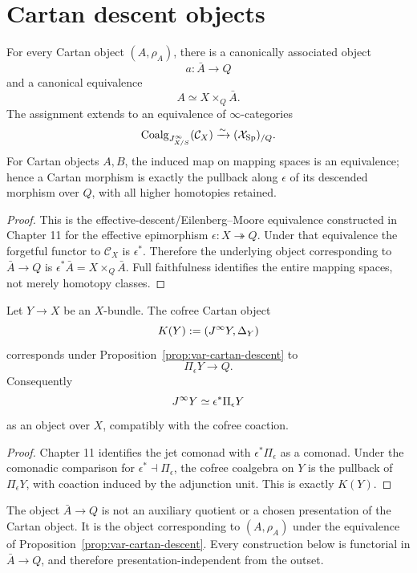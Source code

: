 \section{Cartan descent objects}
\label{sec:var-cartan-descent}

\begin{proposition}
\label{prop:var-cartan-descent}
For every Cartan object \((A,\rho_A)\), there is a canonically associated object
\[
    a:\bar A\longrightarrow Q
\]
and a canonical equivalence
\[
    A\simeq X\times_Q\bar A.
\]
The assignment extends to an equivalence of \(\infty\)-categories
\[
    \operatorname{Coalg}_{J^{\infty}_{X/S}}(\mathcal C_X)
    \xrightarrow{\sim}
    (\mathcal{X}_{\mathrm{Sp}})_{/Q}.
\]
For Cartan objects \(A,B\), the induced map on mapping spaces is an equivalence; hence a Cartan morphism is exactly the pullback along \(\epsilon\) of its descended morphism over \(Q\), with all higher homotopies retained.
\end{proposition}

\begin{proof}
This is the effective-descent/Eilenberg--Moore equivalence constructed in Chapter 11 for the effective epimorphism \(\epsilon:X\twoheadrightarrow Q\). Under that equivalence the forgetful functor to \(\mathcal C_X\) is \(\epsilon^*\). Therefore the underlying object corresponding to \(\bar A\to Q\) is \(\epsilon^*\bar A=X\times_Q\bar A\). Full faithfulness identifies the entire mapping spaces, not merely homotopy classes.
\end{proof}

\begin{proposition}
\label{prop:var-cofree-descent}
Let \(Y\to X\) be an \(X\)-bundle. The cofree Cartan object
\[
    K(Y):=(J^{\infty} Y,\Delta_Y)
\]
corresponds under Proposition~\ref{prop:var-cartan-descent} to
\[
    \Pi_\epsilon Y\longrightarrow Q.
\]
Consequently
\[
    J^{\infty} Y\simeq\epsilon^*\Pi_\epsilon Y
\]
as an object over \(X\), compatibly with the cofree coaction.
\end{proposition}

\begin{proof}
Chapter 11 identifies the jet comonad with \(\epsilon^*\Pi_\epsilon\) as a comonad. Under the comonadic comparison for \(\epsilon^*\dashv\Pi_\epsilon\), the cofree coalgebra on \(Y\) is the pullback of \(\Pi_\epsilon Y\), with coaction induced by the adjunction unit. This is exactly \(K(Y)\).
\end{proof}

\begin{remark}
\label{rem:var-descent-base}
The object \(\bar A\to Q\) is not an auxiliary quotient or a chosen presentation of the Cartan object. It is the object corresponding to \((A,\rho_A)\) under the equivalence of Proposition~\ref{prop:var-cartan-descent}. Every construction below is functorial in \(\bar A\to Q\), and therefore presentation-independent from the outset.
\end{remark}

